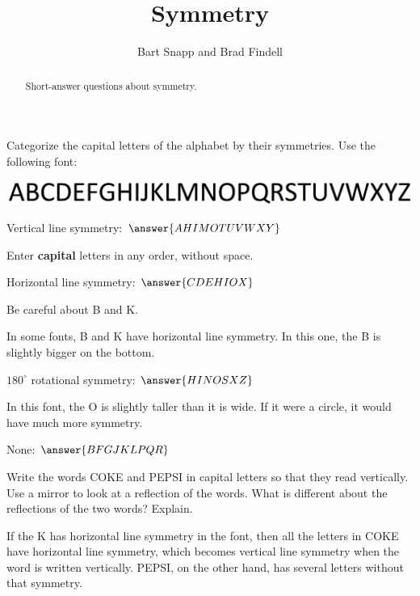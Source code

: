 \documentclass[nooutcomes]{ximera}
\title{Symmetry}
\author{Bart Snapp and Brad Findell}
\begin{document}
\begin{abstract}
Short-answer questions about symmetry. 
\end{abstract}
\maketitle

\begin{question}
Categorize the capital letters of the alphabet by their symmetries.  Use the following font: 
\begin{image}
\includegraphics[scale=0.35]{alphabet.png}
\end{image}
\begin{question}
Vertical line symmetry:  $\answer{AHIMOTUVWXY}$
\begin{feedback}[incorrect]
Enter \textbf{capital} letters in any order, without space.
\end{feedback}
\end{question}
\begin{question}
Horizontal line symmetry:  $\answer{CDEHIOX}$  
\begin{feedback}[incorrect]
Be careful about B and K.  
\end{feedback}
\begin{feedback}[correct]
In some fonts, B and K have horizontal line symmetry.  In this one, the B is slightly bigger on the bottom.  
\end{feedback}
\end{question}
\begin{question}
$180^\circ$ rotational symmetry: $\answer{HINOSXZ}$
\begin{feedback}[correct]
In this font, the O is slightly taller than it is wide.  If it were a circle, it would have much more symmetry.
\end{feedback}
\end{question}
\begin{question}
None: $\answer{BFGJKLPQR}$
\end{question}
\end{question}

\begin{question}
Write the words COKE and PEPSI in capital letters so that they read vertically.  Use a mirror to look at a reflection of the words.  What is different about the reflections of the two words?  Explain.  
\begin{freeResponse}
\end{freeResponse}
\begin{hint}
If the K has horizontal line symmetry in the font, then all the letters in COKE have horizontal line symmetry, which becomes vertical line symmetry when the word is written vertically. PEPSI, on the other hand, has several letters without that symmetry.  
\end{hint}
\end{question}
\end{document}
